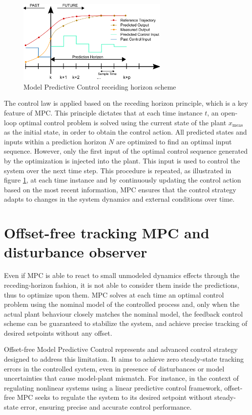 \documentclass[a4paper,12pt,oneside]{book}
\begin{document}
\begin{figure}
	\centering
	\includegraphics[width=0.66\textwidth]{MPC.png}
	\caption{Model Predictive Control receiding horizon scheme}
	\label{image:mpc}
\end{figure}

\bigskip
The control law is applied based on the receding horizon principle, which is a key feature of MPC.
This principle dictates that at each time instance $t$, an open-loop optimal control problem is solved using the current state of the plant $x_{\text{meas}}$ as the initial state, in order to obtain the control action. 
All predicted states and inputs within a prediction horizon $N$ are optimized to find an optimal input sequence.
However, only the first input of the optimal control sequence generated by the optimization is injected into the plant. 
This input is used to control the system over the next time step.
This procedure is repeated, as illustrated in figure \ref{image:mpc}, at each time instance and by continuously updating the control action based on the most recent information, MPC ensures that the control strategy adapts to changes in the system dynamics and external conditions over time.




\section{Offset-free tracking MPC and disturbance observer}
Even if MPC is able to react to small unmodeled dynamics effects through the receding-horizon fashion, it is not able to consider them inside the predictions, thus to optimize upon them.
MPC solves at each time an optimal control problem using the nominal model of the controlled process and, only when the actual plant behaviour closely matches the nominal model, the feedback control scheme can be guaranteed to stabilize the system, and achieve precise tracking of desired setpoints without any offset.

Offset-free Model Predictive Control represents and advanced control strategy designed to address this limitation. It aims to achieve zero steady-state tracking errors in the controlled system, even in presence of disturbances or model uncertainties that cause model-plant mismatch.
For instance, in the context of regulating nonlinear systems using a linear predictive control framework, offset-free MPC seeks to regulate the system to its desired setpoint without steady-state error, ensuring precise and accurate control performance.
\end{document}
